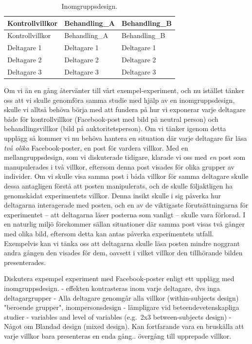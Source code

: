 \documentclass[
]{book}
\begin{document}
\begin{longtable}[]{@{}lll@{}}
\caption{\label{tab:tab-02-07-5-4-01}Inomgruppsdesign.}\tabularnewline
\toprule
Kontrollvillkor & Behandling\_A & Behandling\_B\tabularnewline
\midrule
\endfirsthead
\toprule
Kontrollvillkor & Behandling\_A & Behandling\_B\tabularnewline
\midrule
\endhead
Deltagare 1 & Deltagare 1 & Deltagare 1\tabularnewline
Deltagare 2 & Deltagare 2 & Deltagare 2\tabularnewline
Deltagare 3 & Deltagare 3 & Deltagare 3\tabularnewline
\bottomrule
\end{longtable}

Om vi än en gång återvänter till vårt exempel-experiment, och nu istället tänker oss att vi skulle genomföra samma studie med hjälp av en inomgruppsdesign, skulle vi alltså behöva börja med att fundera på hur vi exponerar varje deltagare både för kontrollvillkor (Facebook-post med bild på neutral person) och behandlingsvillkor (bild på auktoritetsperson). Om vi tänker igenom detta upplägg så kommer vi nu behöva hantera en situation där varje deltagare får läsa \emph{två olika} Facebook-poster, en post för vardera villkor. Med en mellangruppsdesign, som vi diskuterade tidigare, klarade vi oss med \emph{en} post som manupulerades i två villkor, eftersom denna post visades för olika grupper av individer. Om vi skulle visa samma post i båda villkor för samma deltagare skulle dessa antagligen förstå att posten manipulerats, och de skulle följaktligen ha genomskådat experimentets villkor. Denna insikt skulle i sig påverka hur deltagarna interagerade med posten, och en av de viktigaste förutsättningarna för experimentet -- att deltagarna läser posterna som vanligt -- skulle vara förlorad. I en naturlig miljö förekommer sällan situationer där samma post visas två gånger med olika bild, eftersom detta kan antas påverka experimentets utfall. Exempelvis kan vi tänka oss att deltagarna skulle läsa posten mindre noggrant andra gången den visades för dem, oavsett i vilket villkor den tillhörande bilden presenterades.

Diskutera expempel experiment med Facebook-poster enligt ett upplägg med inomgruppsdesign. - effekten kontrasteras inom varje deltagare, dvs inga deltagargrupper - Alla deltagare genomgår alla villkor (within-subjects design) "beroende grupper", inompersonsdesign - lämpligare vid beteendevetenskapliga studier - variables and level of variables (e.g.~2x3 between-subjects design) - Något om Blandad design (mixed design). Kan fortfarande vara en bruskälla att varje villkor bara presenteras en enda gång.. övergång till upprepade villkor.
\end{document}
